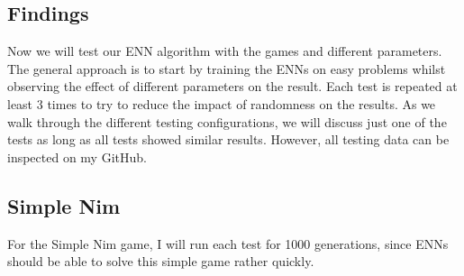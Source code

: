 \documentclass[11pt]{report}
\begin{document}
\begin{enumerate}
    \section{Findings}\label{sec:first-findings}
    Now we will test our ENN algorithm with the games and different parameters.
    The general approach is to start by training the ENNs on easy problems whilst observing the effect of different parameters on the result.
    Each test is repeated at least 3 times to try to reduce the impact of randomness on the results.
    As we walk through the different testing configurations, we will discuss just one of the tests as long as all tests showed similar results.
    However, all testing data can be inspected on my GitHub.
            \subsection{Simple Nim}\label{subsec:simple-nim-results}
    For the Simple Nim game, I will run each test for 1000 generations, since ENNs should be able to solve this simple game rather quickly.

\end{enumerate}
\end{document}
